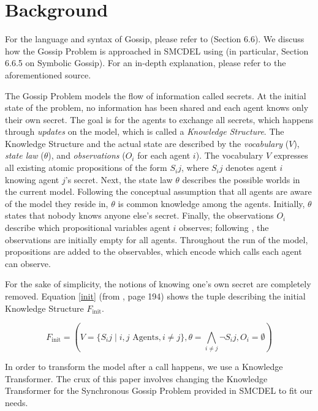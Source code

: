 \section{Background}\label{sec:Background}

For the language and syntax of Gossip, please refer to \cite{GattingerThesis2018} (Section 6.6). 
We discuss how the Gossip Problem is approached in SMCDEL using \cite{GattingerThesis2018} (in particular, Section 6.6.5 on Symbolic Gossip). 
For an in-depth explanation, please refer to the aforementioned source.

The Gossip Problem models the flow of information called secrets. 
At the initial state of the problem, no information has been shared and each agent knows only their own secret. The goal is for 
the agents to exchange all secrets, which happens through \textit{updates} on the model, which is called a \textit{Knowledge Structure}. 
The Knowledge Structure and the actual state are described by the \textit{vocabulary} ($V$), 
\textit{state law} ($\theta$), and \textit{observations} ($O_i$ for each agent $i$). The vocabulary $V$ expresses all existing atomic propositions of 
the form $S_ij$, where $S_ij$ denotes agent $i$ knowing agent $j$'s secret. 
Next, the state law $\theta$ describes the possible worlds in the current model. Following the conceptual assumption that all agents
are aware of the model they reside in, $\theta$ is common knowledge among the agents. Initially, $\theta$ states that nobody knows 
anyone else's secret. Finally, the observations $O_i$ describe which propositional 
variables agent $i$ observes; following \cite{GattingerThesis2018}, the observations are initially empty for all agents. 
Throughout the run of the model, propositions are added to the observables, which encode which calls each agent can observe.

For the sake of simplicity, the notions of knowing one's own secret are completely removed. 
Equation \ref{init} (from \cite{GattingerThesis2018}, page 194) 
shows the tuple describing the initial Knowledge Structure $F_\text{init}$.

\begin{equation}
\label{init}
    F_\text{init} = (V = \{S_ij \mid i, j \text{ Agents}, i \neq j\}, \theta =\bigwedge_{i\neq j} \lnot S_ij , O_i = \emptyset)
\end{equation}

In order to transform the model after a call happens, we use a Knowledge Transformer. The crux of this paper involves changing 
the Knowledge Transformer for the Synchronous Gossip Problem provided in SMCDEL to fit our needs. 

